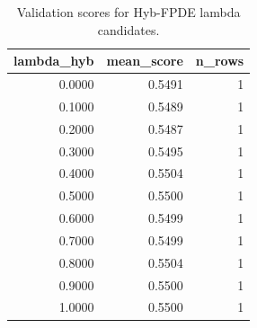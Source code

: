 \begin{table}[t]
\caption{Validation scores for Hyb-FPDE lambda candidates.}
\label{tab:lambda_distribution_computed}
\centering
\begin{tabular}{rrr}
\toprule
lambda\_hyb & mean\_score & n\_rows \\
\midrule
0.0000 & 0.5491 & 1 \\
0.1000 & 0.5489 & 1 \\
0.2000 & 0.5487 & 1 \\
0.3000 & 0.5495 & 1 \\
0.4000 & 0.5504 & 1 \\
0.5000 & 0.5500 & 1 \\
0.6000 & 0.5499 & 1 \\
0.7000 & 0.5499 & 1 \\
0.8000 & 0.5504 & 1 \\
0.9000 & 0.5500 & 1 \\
1.0000 & 0.5500 & 1 \\
\bottomrule
\end{tabular}

\end{table}
